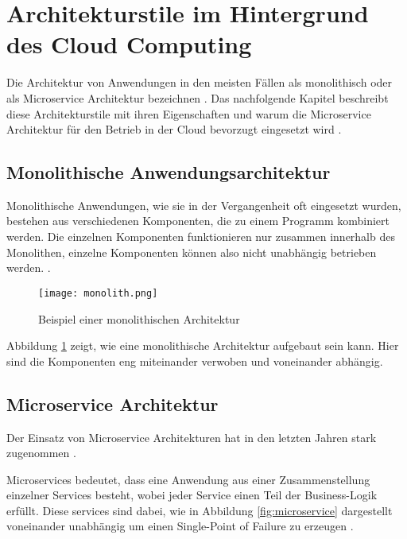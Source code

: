 \section{Architekturstile im Hintergrund des Cloud Computing}
Die Architektur von Anwendungen in den meisten Fällen als monolithisch oder als Microservice Architektur bezeichnen \cite[Vgl.][S. 150]{Gos2020}. Das nachfolgende Kapitel beschreibt diese Architekturstile mit ihren Eigenschaften und warum die Microservice Architektur für den Betrieb in der Cloud bevorzugt eingesetzt wird \cite[Vgl.][S. 1]{Villamizar2015}.

\subsection{Monolithische Anwendungsarchitektur}
Monolithische Anwendungen, wie sie in der Vergangenheit oft eingesetzt wurden, bestehen aus verschiedenen Komponenten, die zu einem Programm kombiniert werden. Die einzelnen Komponenten funktionieren nur zusammen innerhalb des Monolithen, einzelne Komponenten können also nicht unabhängig betrieben werden. \cite[Vgl.][S. 1]{Gos2020}.

\begin{figure}[H]
    \centering
    \texttt{[image: monolith.png]}
    \caption{Beispiel einer monolithischen Architektur \cite[Nachbildung angelehnt an][S. 150]{Gos2020}}
    \label{fig:monolith}
\end{figure}

Abbildung \ref{fig:monolith} zeigt, wie eine monolithische Architektur aufgebaut sein kann. Hier sind die Komponenten eng miteinander verwoben und voneinander abhängig.
\pagebreak

\subsection{Microservice Architektur}
Der Einsatz von Microservice Architekturen hat in den letzten Jahren stark zugenommen \cite[Vgl.][S. 150]{Gos2020}.

Microservices bedeutet, dass eine Anwendung aus einer Zusammenstellung einzelner Services besteht, wobei jeder Service einen Teil der Business-Logik erfüllt. Diese services sind dabei, wie in Abbildung \ref{fig:microservice} dargestellt voneinander unabhängig um einen Single-Point of Failure zu erzeugen \cite[Vgl.][S. 150]{Gos2020}\cite[Vgl.][]{Janssen2021}\cite[Vgl.][]{Fowler2014}.

